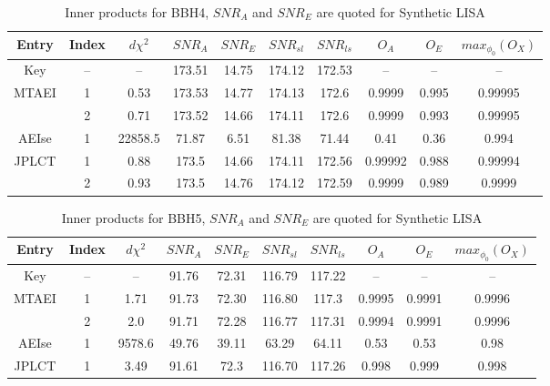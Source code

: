 \documentclass[prd,aps,amsfonts,amsmath, nofootinbib]{revtex4}
\begin{document}
\begin{table}
\caption{\label{BBH4} Inner products for BBH4, $SNR_A$ and $SNR_E$ are
quoted for Synthetic LISA}
\begin{ruledtabular}
\begin{tabular}{|c|c|c|c|c|c|c|c|c|c|}
Entry & Index & $d\chi^2$ & $SNR_A$ & $SNR_E$ & $SNR_{sl}$ &  $SNR_{ls}$ & $O_A$ & $O_E$ & $max_{\phi_0}(O_X)$\\
\hline
Key & -- & -- & 173.51 & 14.75 & 174.12 & 172.53 & -- & -- & -- \\
\hline
MTAEI & 1 & 0.53 & 173.53 & 14.77 & 174.13 & 172.6 & 0.9999 & 0.995 & 0.99995 \\
      & 2 & 0.71 & 173.52 & 14.66 & 174.11 & 172.6 & 0.9999  & 0.993 &  0.99995\\
\hline
AEIse & 1 & 22858.5 & 71.87 & 6.51 & 81.38 & 71.44 & 0.41  & 0.36 & 0.994 \\
\hline
JPLCT & 1 & 0.88 & 173.5 & 14.66 & 174.11 & 172.56  & 0.99992 &  0.988 & 0.99994\\
      & 2 & 0.93 & 173.5 & 14.76 & 174.12 & 172.59  & 0.9999 & 0.989 & 0.9999 \\
\end{tabular}
\end{ruledtabular}
\end{table}

\begin{table}
\caption{\label{BBH5} Inner products for BBH5, $SNR_A$ and $SNR_E$ are
quoted for Synthetic LISA}
\begin{ruledtabular}
\begin{tabular}{|c|c|c|c|c|c|c|c|c|c|}
Entry & Index & $d\chi^2$ & $SNR_A$ & $SNR_E$ & $SNR_{sl}$ &  $SNR_{ls}$ & $O_A$ & $O_E$ & $max_{\phi_0}(O_X)$\\
\hline
Key & -- & -- & 91.76 & 72.31 & 116.79 & 117.22 & -- & -- & -- \\
\hline
MTAEI & 1 & 1.71 & 91.73 & 72.30 & 116.80 & 117.3 & 0.9995 & 0.9991 & 0.9996 \\
      & 2 & 2.0 & 91.71 & 72.28 & 116.77 & 117.31 & 0.9994  & 0.9991 & 0.9996 \\
\hline
AEIse & 1 & 9578.6 & 49.76 & 39.11 & 63.29 & 64.11 & 0.53 & 0.53 &  0.98  \\
\hline
JPLCT & 1 & 3.49 & 91.61 & 72.3 & 116.70 & 117.26 & 0.998 & 0.999  &  0.998\\
\end{tabular}
\end{ruledtabular}
\end{table}
\end{document}
